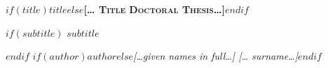 \documentclass[$if(fontsize)$$fontsize$,$endif$$if(papersize)$$papersize$paper,twoside,$endif$$for(classoption)$$classoption$$sep$,$endfor$]{$documentclass$} %
\begin{document}
\frontmatter
\thispagestyle{empty}
\def\drop{.1\textheight}

\vspace*{\drop}
\begin{center}
\huge\textbf{\textsc{$if(title)$$title$$else$[… Title Doctoral Thesis…]$endif$}}\par
$if(subtitle)$
\Large\textsc{$subtitle$}\par
$endif$
\vspace{\baselineskip}
{\Large \textit{$if(author)$$author$$else$[…given names in full…] [… surname…]$endif$}}
\end{center}




\end{document}
